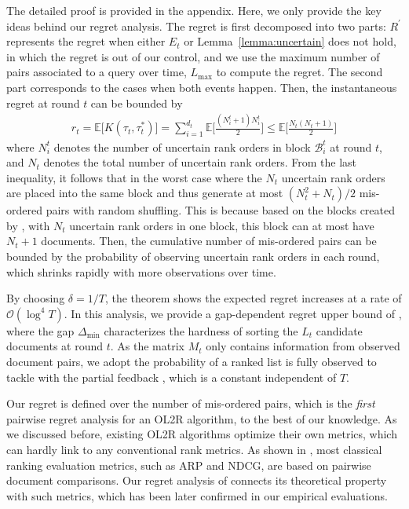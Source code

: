\begin{hproof}
The detailed proof is provided in the appendix. Here, we only provide the key ideas behind our regret analysis.
The regret is first decomposed into two parts: $R^\prime$ represents the regret when either $E_t$ or Lemma~\ref{lemma:uncertain} does not hold, in which the regret is out of our control, and we use the maximum number of pairs associated to a query over time, $L_{\text{max}}$ to compute the regret. The second part corresponds to the cases when both events happen. Then, the instantaneous regret at round $t$ can be bounded by
\begin{align}
    r_t = \mathbb{E} \big[K(\tau_t, \tau_t^*)\big] = \sum\nolimits_{i=1}^{d_t}\mathbb{E}\big[\frac{(N_i^t + 1)N_i^t}{2}\big] \leq \mathbb{E}\big[\frac{N_t(N_t + 1)}{2}\big]
\end{align}
where $N_i^t$ denotes the number of uncertain rank orders in block $\mathcal{B}_i^t$ at round $t$, and $N_t$ denotes the total number of uncertain rank orders.
From the last inequality, it follows that in the worst case where the $N_t$ uncertain rank orders are placed into the same block and thus generate at most $({N_t^2 + N_t})/{2}$ mis-ordered pairs with random shuffling. This is because based on the blocks created by \model{}, with $N_t$ uncertain rank orders in one block, this block can at most have $N_t + 1$ documents. Then, the cumulative number of mis-ordered pairs can be bounded by the probability of observing uncertain rank orders in each round, which shrinks rapidly with more observations over time.
\end{hproof}

\begin{remark}[1] 
By choosing $\delta = 1/T$, the theorem shows the expected regret increases at a rate of $\mathcal{O}({\log^4{T}})$. In this analysis, we provide a gap-dependent regret upper bound of \model{}, where the gap $\Delta_{\min}$ characterizes the hardness of sorting the $L_t$ candidate documents at round $t$. As the matrix $M_t$ only contains information from observed document pairs, we adopt the probability of a ranked list is fully observed to tackle with the partial feedback \cite{kveton2015combinatorial, kveton2015tight}, which is a constant independent of $T$.
\end{remark}

\begin{remark}[2]
Our regret is defined over the number of mis-ordered pairs, which is the \emph{first} pairwise regret analysis for an OL2R algorithm, to the best of our knowledge. As we discussed before, existing OL2R algorithms optimize their own metrics, which can hardly link to any conventional rank metrics. As shown in \cite{Wang2018Lambdaloss}, most classical ranking evaluation metrics, such as ARP and NDCG, are based on pairwise document comparisons. Our regret analysis of \model{} connects its theoretical property with such metrics, which has been later confirmed in our empirical evaluations.   
\end{remark}
